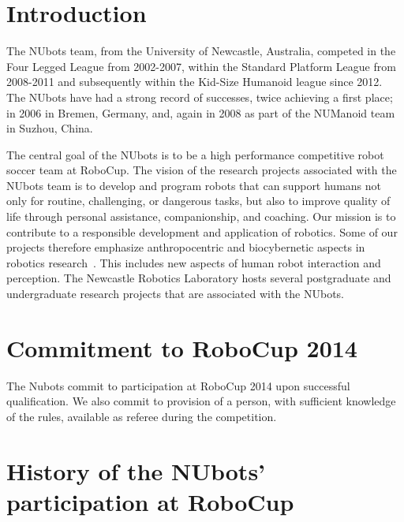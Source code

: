 \documentclass{llncs}
\begin{document}
%
\section{Introduction}
%
The NUbots team, from the University of Newcastle, Australia, competed in the Four Legged League from 2002-2007, within the Standard Platform League from 2008-2011 and subsequently within the Kid-Size Humanoid league since 2012. The NUbots have had a strong record of successes, twice achieving a first place; in 2006 in Bremen, Germany, and, again in 2008 as part of the NUManoid team in Suzhou, China.

The central goal of the NUbots is to be a high performance competitive robot soccer team at RoboCup. The vision of the research projects associated with the NUbots team is to develop and program robots that can support humans not only for routine, challenging, or dangerous tasks, but also to improve quality of life through personal assistance, companionship, and coaching.  Our mission is to contribute to a responsible development and application of robotics. Some of our projects therefore emphasize anthropocentric and biocybernetic
aspects in robotics research~\cite{ChalupOstwald2009}. This includes new aspects of human robot interaction and perception. The Newcastle Robotics Laboratory hosts several postgraduate and undergraduate research projects that are associated with the NUbots.


\section{Commitment to RoboCup 2014}
The Nubots commit to participation at RoboCup 2014 upon successful qualification. We also commit to provision of a person, with sufficient knowledge of the rules, available as referee during the competition.

\section{History of the NUbots' participation at RoboCup}
\end{document}
